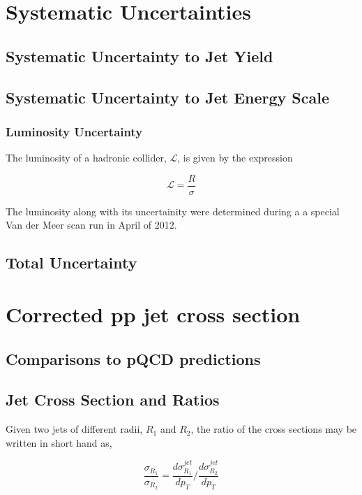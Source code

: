 \section{Systematic Uncertainties}

\subsection{Systematic Uncertainty to Jet Yield}

\subsection{Systematic Uncertainty to Jet Energy Scale}

\subsubsection{Luminosity Uncertainty}

The luminosity of a hadronic collider, $\mathscr{L}$, is given by the expression



\begin{equation}
\mathscr{L} = \frac{R}{\sigma}
\label{eq:xlumdef}
\end{equation}

The luminosity along with its uncertainity were determined during a a special Van der Meer scan run in April of 2012\cite{ALICE-PUBLIC-2017-002}.
\subsection{Total Uncertainty}

\section{Corrected pp jet cross section}


\subsection{Comparisons to pQCD predictions}

\subsection{Jet Cross Section and Ratios}

Given two jets of different radii, $R_{1}$ and $R_{2}$, the ratio of the cross sections may be written in short hand as,

\begin{equation}
	\frac{\sigma_{R_{1}}}{\sigma_{R_{2}}}= \frac{d \sigma^{jet}_{R_{1}}}{dp_{T}} \Bigg/  \frac{d \sigma^{jet}_{R_{2}}}{dp_{T}}
\label{eq:xsecratiodef}
\end{equation}

